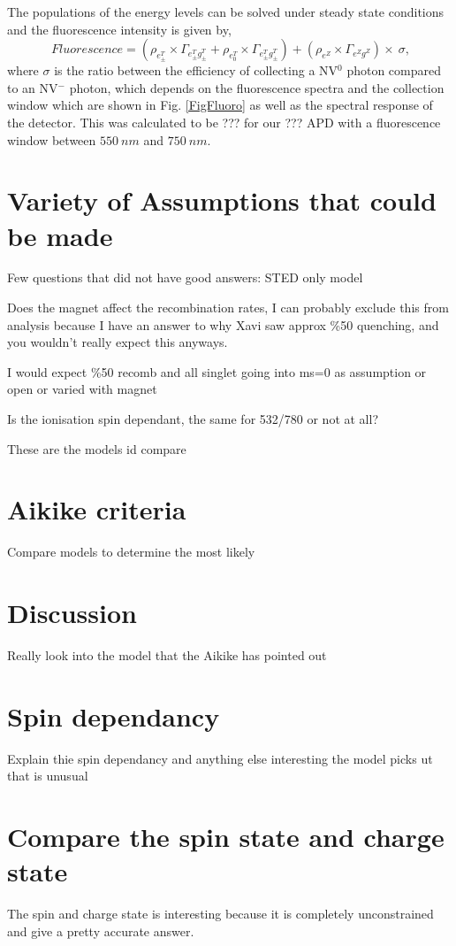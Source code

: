 \documentclass[preprint,prl]{revtex4}
\begin{document}
The populations of the energy levels can be solved under steady state conditions and the fluorescence intensity is given by,
\begin{equation}
\SI{}{Fluorescence} = \left(\rho_{e^{T}_\pm}\times\Gamma_{e^T_{\pm}g^T_{\pm}} +\rho_{e^{T}_0}\times\Gamma_{e^T_{\pm}g^T_{\pm}}\right)+\left(\rho_{e^Z}\times\Gamma_{e^Zg^Z}\right)\times\SI{}{\sigma},
\label{EqnFluoro}
\end{equation}
where $\sigma$ is the ratio between the efficiency of collecting a NV$^0$ photon compared to an NV$^-$ photon, which depends on the fluorescence spectra and the collection window which are shown in Fig. \ref{FigFluoro} as well as the spectral response of the detector. This was calculated to be ??? for our ??? APD with a fluorescence window between $\SI{550}{nm}$ and $\SI{750}{nm}$.

\section{Variety of Assumptions that could be made}
Few questions that did not have good answers:
STED only model

Does the magnet affect the recombination rates, I can probably exclude this from analysis because I have an answer to why Xavi saw approx \%50 quenching, and you wouldn't really expect this anyways.

I would expect \%50 recomb and all singlet going into ms=0 as assumption or open or varied with magnet

Is the ionisation spin dependant, the same for 532/780 or not at all?


These are the models id compare
\section{Aikike criteria}
Compare models to determine the most likely

\section{Discussion}
Really look into the model that the Aikike has pointed out
\section{Spin dependancy}
Explain thie spin dependancy and anything else interesting the model picks ut that is unusual
\section{Compare the spin state and charge state}
The spin and charge state is interesting because it is completely unconstrained and give a pretty accurate answer.
\end{document}
